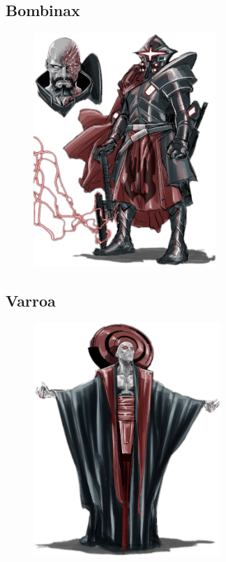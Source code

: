 \subsection{Bombinax} \label{sec:bombinax}
\begin{figure}[h!]
    \centering
    \includegraphics[height=250pt]{_img/pnjs/bombinax.png}
\end{figure}
\newpage

\subsection{Varroa} \label{sec:varroa}
\begin{figure}[h!]
    \centering
    \includegraphics[height=250pt]{_img/pnjs/varroa.png}
\end{figure}

\newpage
